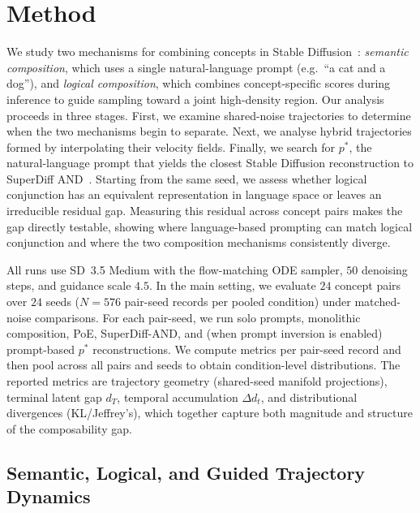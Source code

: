 
\section{Method}

We study two mechanisms for combining concepts in Stable Diffusion~\cite{scaling_rectified_flow_transformers_for_high_resolution_image_synthesis}: \emph{semantic composition}, which uses a single natural-language prompt (e.g.\ ``a cat and a dog''), and \emph{logical composition}, which combines concept-specific scores during inference to guide sampling toward a joint high-density region. Our analysis proceeds in three stages. First, we examine shared-noise trajectories to determine when the two mechanisms begin to separate. Next, we analyse hybrid trajectories formed by interpolating their velocity fields. Finally, we search for $p^*$, the natural-language prompt that yields the closest Stable Diffusion reconstruction to SuperDiff AND~\cite{skreta2025the}. Starting from the same seed, we assess whether logical conjunction has an equivalent representation in language space or leaves an irreducible residual gap. Measuring this residual across concept pairs makes the gap directly testable, showing where language-based prompting can match logical conjunction and where the two composition mechanisms consistently diverge. 

All runs use SD~3.5 Medium with the flow-matching ODE sampler, \(50\) denoising steps, and guidance scale \(4.5\). In the main setting, we evaluate \(24\) concept pairs over \(24\) seeds (\(N=576\) pair-seed records per pooled condition) under matched-noise comparisons. For each pair-seed, we run solo prompts, monolithic composition, PoE, SuperDiff-AND, and (when prompt inversion is enabled) prompt-based \(p^*\) reconstructions. We compute metrics per pair-seed record and then pool across all pairs and seeds to obtain condition-level distributions. The reported metrics are trajectory geometry (shared-seed manifold projections), terminal latent gap \(d_T\), temporal accumulation \(\Delta d_t\), and distributional divergences (KL/Jeffrey's), which together capture both magnitude and structure of the composability gap.

\subsection{Semantic, Logical, and Guided Trajectory Dynamics}
\label{sec:trajectory_dynamics}

